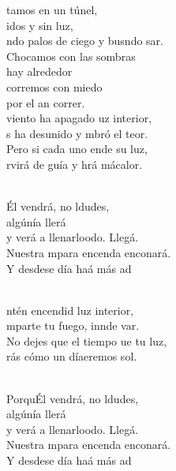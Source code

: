 \begin{cancion}%
	tamos en un túnel, \\
	idos y sin luz,\\
	ndo palos de ciego y busndo sar.\\
Chocamos con las sombras \\
	hay alrededor\\
	corremos con miedo \\
	por el an correr.\\
\jump
	 viento ha apagado uz interior,\\
	s ha desunido y mbró el teor.\\
	Pero si cada uno ende su luz,\\
	rvirá de guía y hrá mácalor.\\\jump\\
	\begin{chorus}%
	Él vendrá, no ldudes, \\
	algúnía llerá\\
	y verá a llenarloodo. Llegá. \\
	Nuestra mpara encenda enconará. \\
	Y desdese día haá más ad\\
	\end{chorus}%
	\jump\\
	ntén encendid luz interior,\\
	mparte tu fuego, innde var.\\
	No dejes que el tiempo ue tu luz,\\
	rás cómo un díaeremos  sol.\\\jump\\
	\begin{chorus}%
	PorquÉl vendrá, no ldudes, \\
	algúnía llerá\\
	y verá a llenarloodo. Llegá. \\
	Nuestra mpara encenda enconará. \\
	Y desdese día haá más ad\\
	\end{chorus}%
	\jump\\
\end{cancion}%
